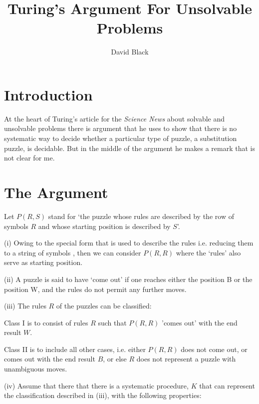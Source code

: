 \documentclass{article}[12pt]
\title{Turing's Argument For Unsolvable Problems}
\author{David Black}
\begin{document}
\maketitle

\section*{Introduction}

\noindent
At the heart of Turing's article for the \emph{Science News}  about solvable and unsolvable problems there is argument that he uses to show that there is no systematic way to decide whether a particular type of puzzle, a substitution puzzle, is decidable\cite{Turing1}.  But in the middle of the argument he makes a remark that is not clear for me. 

\section*{The Argument} 

\noindent

Let $P(R,S)$ stand for ‘the puzzle whose rules are described by the row of symbols $R$ and whose starting position is described by $S$’. 

\noindent

(i) Owing to the special form that is used to describe the rules i.e. reducing them to a string of symbols \cite{Turing1}, then we can consider $P(R,R)$ where the ‘rules’ also serve as starting position. 

\noindent

(ii)  A puzzle is said to have ‘come out’ if one reaches either the position B or the position W, and the rules do not permit any further moves. 

\noindent

(iii) The rules $R$ of the puzzles can be classified:

\noindent

Class I is to consist of rules $R$ such that $P(R,R)$ 'comes out' with the end result $W$.

\noindent

Class II is to include all other cases, i.e. either $P(R,R)$ does not come out, or comes out with the end result $B$, or else $R$ does not represent a puzzle with unambiguous moves. 

\noindent

(iv) Assume that there that there is a systematic procedure, $K$ that can represent the classification described in (iii), with the following properties:
\end{document}
